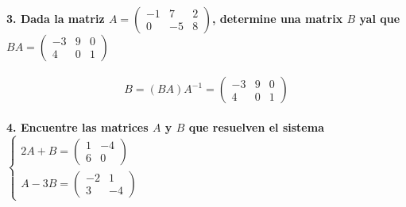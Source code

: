 \documentclass[
]{article}
\begin{document}
\hypertarget{dada-la-matriz-a-beginpmatrix--1720-58-endpmatrix-determine-una-matrix-b-yal-que-ba-beginpmatrix--3-9-0-4-0-1-endpmatrix}{%
\paragraph{\texorpdfstring{3. Dada la matriz
\(A= \begin{pmatrix} -1&7&2\\0&-5&8 \end{pmatrix}\), determine una
matrix \(B\) yal que
\(BA = \begin{pmatrix} -3 & 9 & 0 \\ 4 & 0 & 1 \end{pmatrix}\)}{3. Dada la matriz A= \textbackslash begin\{pmatrix\} -1\&7\&2\textbackslash\textbackslash0\&-5\&8 \textbackslash end\{pmatrix\}, determine una matrix B yal que BA = \textbackslash begin\{pmatrix\} -3 \& 9 \& 0 \textbackslash\textbackslash{} 4 \& 0 \& 1 \textbackslash end\{pmatrix\}}}\label{dada-la-matriz-a-beginpmatrix--1720-58-endpmatrix-determine-una-matrix-b-yal-que-ba-beginpmatrix--3-9-0-4-0-1-endpmatrix}}

\[
B = (BA)A^{-1} =  \begin{pmatrix} -3 & 9 & 0 \\ 4 & 0 & 1 \end{pmatrix}
\]

\hypertarget{encuentre-las-matrices-a-y-b-que-resuelven-el-sistema-begincases-2a-b-beginpmatrix-1--4-6-0-endpmatrix-a--3b-beginpmatrix--2-1-3--4-endpmatrix-endcases}{%
\paragraph{\texorpdfstring{4. Encuentre las matrices \(A\) y \(B\) que
resuelven el sistema
\(\begin{cases} 2A + B = \begin{pmatrix} 1 & -4 \\ 6 & 0 \end{pmatrix} \\ A -3B = \begin{pmatrix} -2 & 1 \\ 3 & -4 \end{pmatrix} \end{cases}\)}{4. Encuentre las matrices A y B que resuelven el sistema \textbackslash begin\{cases\} 2A + B = \textbackslash begin\{pmatrix\} 1 \& -4 \textbackslash\textbackslash{} 6 \& 0 \textbackslash end\{pmatrix\} \textbackslash\textbackslash{} A -3B = \textbackslash begin\{pmatrix\} -2 \& 1 \textbackslash\textbackslash{} 3 \& -4 \textbackslash end\{pmatrix\} \textbackslash end\{cases\}}}\label{encuentre-las-matrices-a-y-b-que-resuelven-el-sistema-begincases-2a-b-beginpmatrix-1--4-6-0-endpmatrix-a--3b-beginpmatrix--2-1-3--4-endpmatrix-endcases}}
\end{document}
